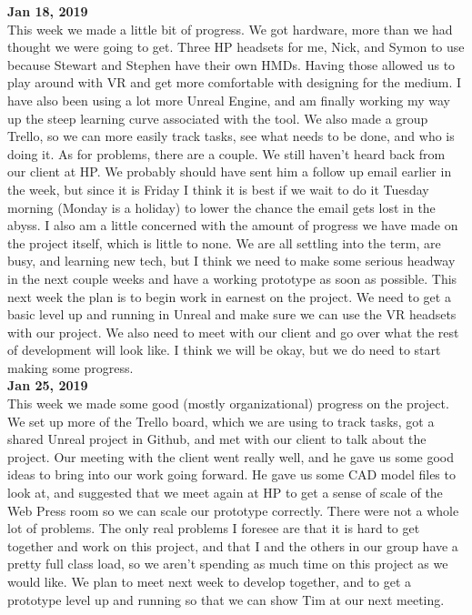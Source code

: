 \textbf{Jan 18, 2019}\\
This week we made a little bit of progress. We got hardware, more than we had thought we were going to get. Three HP headsets for me, Nick, and Symon to use because Stewart and Stephen have their own HMDs. Having those allowed us to play around with VR and get more comfortable with designing for the medium. I have also been using a lot more Unreal Engine, and am finally working my way up the steep learning curve associated with the tool. We also made a group Trello, so we can more easily track tasks, see what needs to be done, and who is doing it.
As for problems, there are a couple. We still haven’t heard back from our client at HP. We probably should have sent him a follow up email earlier in the week, but since it is Friday I think it is best if we wait to do it Tuesday morning (Monday is a holiday) to lower the chance the email gets lost in the abyss. I also am a little concerned with the amount of progress we have made on the project itself, which is little to none. We are all settling into the term, are busy, and learning new tech, but I think we need to make some serious headway in the next couple weeks and have a working prototype as soon as possible.
This next week the plan is to begin work in earnest on the project. We need to get a basic level up and running in Unreal and make sure we can use the VR headsets with our project. We also need to meet with our client and go over what the rest of development will look like. I think we will be okay, but we do need to start making some progress.\\

\textbf{Jan 25, 2019}\\
This week we made some good (mostly organizational) progress on the project. We set up more of the Trello board, which we are using to track tasks, got a shared Unreal project in Github, and met with our client to talk about the project. Our meeting with the client went really well, and he gave us some good ideas to bring into our work going forward. He gave us some CAD model files to look at, and suggested that we meet again at HP to get a sense of scale of the Web Press room so we can scale our prototype correctly.
There were not a whole lot of problems. The only real problems I foresee are that it is hard to get together and work on this project, and that I and the others in our group have a pretty full class load, so we aren’t spending as much time on this project as we would like.
We plan to meet next week to develop together, and to get a prototype level up and running so that we can show Tim at our next meeting.\\

